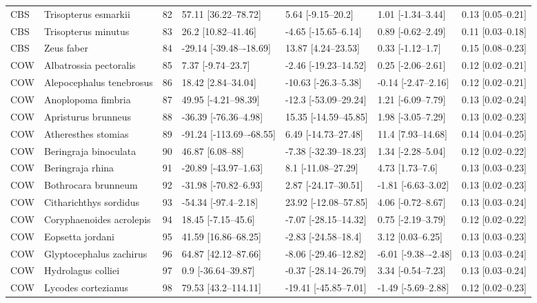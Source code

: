 \begin{longtable}[t]{lllllll}
CBS & Trisopterus esmarkii & 82 & 57.11 [36.22–78.72] & 5.64 [-9.15–20.2] & 1.01 [-1.34–3.44] & 0.13 [0.05–0.21]\\
CBS & Trisopterus minutus & 83 & 26.2 [10.82–41.46] & -4.65 [-15.65–6.14] & 0.89 [-0.62–2.49] & 0.11 [0.03–0.18]\\
CBS & Zeus faber & 84 & -29.14 [-39.48–-18.69] & 13.87 [4.24–23.53] & 0.33 [-1.12–1.7] & 0.15 [0.08–0.23]\\
COW & Albatrossia pectoralis & 85 & 7.37 [-9.74–23.7] & -2.46 [-19.23–14.52] & 0.25 [-2.06–2.61] & 0.12 [0.02–0.21]\\
\addlinespace
COW & Alepocephalus tenebrosus & 86 & 18.42 [2.84–34.04] & -10.63 [-26.3–5.38] & -0.14 [-2.47–2.16] & 0.12 [0.02–0.21]\\
COW & Anoplopoma fimbria & 87 & 49.95 [-4.21–98.39] & -12.3 [-53.09–29.24] & 1.21 [-6.09–7.79] & 0.13 [0.02–0.24]\\
COW & Apristurus brunneus & 88 & -36.39 [-76.36–4.98] & 15.35 [-14.59–45.85] & 1.98 [-3.05–7.29] & 0.13 [0.02–0.23]\\
COW & Atheresthes stomias & 89 & -91.24 [-113.69–-68.55] & 6.49 [-14.73–27.48] & 11.4 [7.93–14.68] & 0.14 [0.04–0.25]\\
COW & Beringraja binoculata & 90 & 46.87 [6.08–88] & -7.38 [-32.39–18.23] & 1.34 [-2.28–5.04] & 0.12 [0.02–0.22]\\
\addlinespace
COW & Beringraja rhina & 91 & -20.89 [-43.97–1.63] & 8.1 [-11.08–27.29] & 4.73 [1.73–7.6] & 0.13 [0.03–0.23]\\
COW & Bothrocara brunneum & 92 & -31.98 [-70.82–6.93] & 2.87 [-24.17–30.51] & -1.81 [-6.63–3.02] & 0.13 [0.02–0.23]\\
COW & Citharichthys sordidus & 93 & -54.34 [-97.4–2.18] & 23.92 [-12.08–57.85] & 4.06 [-0.72–8.67] & 0.13 [0.03–0.24]\\
COW & Coryphaenoides acrolepis & 94 & 18.45 [-7.15–45.6] & -7.07 [-28.15–14.32] & 0.75 [-2.19–3.79] & 0.12 [0.02–0.22]\\
COW & Eopsetta jordani & 95 & 41.59 [16.86–68.25] & -2.83 [-24.58–18.4] & 3.12 [0.03–6.25] & 0.13 [0.03–0.23]\\
\addlinespace
COW & Glyptocephalus zachirus & 96 & 64.87 [42.12–87.66] & -8.06 [-29.46–12.82] & -6.01 [-9.38–-2.48] & 0.13 [0.03–0.24]\\
COW & Hydrolagus colliei & 97 & 0.9 [-36.64–39.87] & -0.37 [-28.14–26.79] & 3.34 [-0.54–7.23] & 0.13 [0.03–0.24]\\
COW & Lycodes cortezianus & 98 & 79.53 [43.2–114.11] & -19.41 [-45.85–7.01] & -1.49 [-5.69–2.88] & 0.12 [0.02–0.23]\\

\end{longtable}

